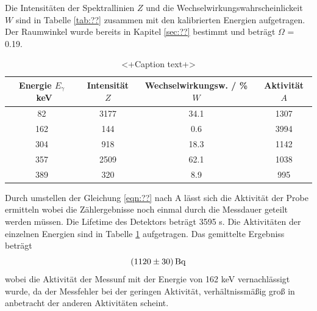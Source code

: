 Die Intensitäten der Spektrallinien $Z$ und die Wechselwirkungswahrscheinlickeit $W$ sind in Tabelle \ref{tab:??} zusammen mit den kalibrierten Energien aufgetragen. Der Raumwinkel wurde bereits in Kapitel \ref{sec:??} bestimmt und beträgt $\Omega$ = 0.19.
\begin{table}
  \centering
  \begin{tabular}{c c c c}
    \toprule
	Energie $E_\gamma$ \ keV & Intensität $Z$ & Wechselwirkungsw. / \% $W$ & Aktivität $A$ \\
    \hline
	82	& 3177	& 34.1	& 1307	\\
	162	& 144	& 0.6	& 3994	\\
	304	& 918	& 18.3	& 1142	\\
	357	& 2509	& 62.1	& 1038	\\
	389	& 320	& 8.9	& 995	\\
    \bottomrule
  \end{tabular}
  \caption{<+Caption text+>}
  \label{tab:Ba}
\end{table}
Durch umstellen der Gleichung \ref{eqn:??} nach A lässt sich die Aktivität der Probe ermitteln wobei die Zählergebnisse noch einmal durch die Messdauer geteilt werden müssen. Die Lifetime des Detektors beträgt 3595 s. Die Aktivitäten der einzelnen Energien sind in Tabelle \ref{tab:Ba} aufgetragen. Das gemittelte Ergebniss beträgt 
\begin{equation}
  (\num{1120 +- 30}) \, \text{Bq}
  \label{eqn:aktBq}
\end{equation}
wobei die Aktivität der Messunf mit der Energie von 162 keV vernachlässigt wurde, da der Messfehler bei der geringen Aktivität, verhältnissmäßig groß in anbetracht der anderen Aktivitäten scheint.
